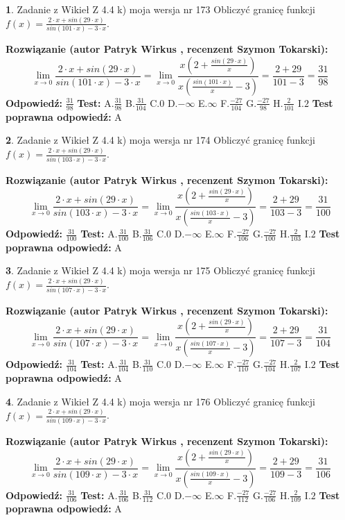 \documentclass[12pt, a4paper]{article}
\theoremstyle{definition} %
\newtheorem{zad}{}
\newcommand{\zadStart}[1]{\begin{zad}#1\newline}
\newcommand{\zadStop}{\end{zad}}
\newcommand{\rozwStart}[2]{\noindent \textbf{Rozwiązanie (autor #1 , recenzent #2): }\newline}
\newcommand{\rozwStop}{\newline}
\newcommand{\odpStart}{\noindent \textbf{Odpowiedź:}\newline}
\newcommand{\odpStop}{\newline}
\newcommand{\testStart}{\noindent \textbf{Test:}\newline}
\newcommand{\testStop}{\newline}
\newcommand{\kluczStart}{\noindent \textbf{Test poprawna odpowiedź:}\newline}
\newcommand{\kluczStop}{\newline}
\begin{document}
\zadStart{Zadanie z Wikieł Z 4.4 k) moja wersja nr 173}
Obliczyć granicę funkcji $f(x)=\frac{2\cdot x +sin(29\cdot x)}{sin(101\cdot x) -3\cdot x}$.
\zadStop
\rozwStart{Patryk Wirkus}{Szymon Tokarski}
$$\lim\limits_{x\to 0}\frac{2\cdot x +sin(29\cdot x)}{sin(101\cdot x) -3\cdot x}
=\lim\limits_{x\to 0}\frac{x(2+\frac{sin(29\cdot x)}{x})}{x(\frac{sin(101\cdot x)}{x}-3)}
=\frac{2+29}{101-3} = \frac{31}{98}$$
\rozwStop
\odpStart
$\frac{31}{98}$
\odpStop
\testStart
A.$\frac{31}{98}$
B.$\frac{31}{104}$
C.$0$
D.$-\infty$
E.$\infty$
F.$\frac{-27}{104}$
G.$\frac{-27}{98}$
H.$\frac{2}{101}$
I.$2$
\testStop
\kluczStart
A
\kluczStop



\zadStart{Zadanie z Wikieł Z 4.4 k) moja wersja nr 174}
Obliczyć granicę funkcji $f(x)=\frac{2\cdot x +sin(29\cdot x)}{sin(103\cdot x) -3\cdot x}$.
\zadStop
\rozwStart{Patryk Wirkus}{Szymon Tokarski}
$$\lim\limits_{x\to 0}\frac{2\cdot x +sin(29\cdot x)}{sin(103\cdot x) -3\cdot x}
=\lim\limits_{x\to 0}\frac{x(2+\frac{sin(29\cdot x)}{x})}{x(\frac{sin(103\cdot x)}{x}-3)}
=\frac{2+29}{103-3} = \frac{31}{100}$$
\rozwStop
\odpStart
$\frac{31}{100}$
\odpStop
\testStart
A.$\frac{31}{100}$
B.$\frac{31}{106}$
C.$0$
D.$-\infty$
E.$\infty$
F.$\frac{-27}{106}$
G.$\frac{-27}{100}$
H.$\frac{2}{103}$
I.$2$
\testStop
\kluczStart
A
\kluczStop



\zadStart{Zadanie z Wikieł Z 4.4 k) moja wersja nr 175}
Obliczyć granicę funkcji $f(x)=\frac{2\cdot x +sin(29\cdot x)}{sin(107\cdot x) -3\cdot x}$.
\zadStop
\rozwStart{Patryk Wirkus}{Szymon Tokarski}
$$\lim\limits_{x\to 0}\frac{2\cdot x +sin(29\cdot x)}{sin(107\cdot x) -3\cdot x}
=\lim\limits_{x\to 0}\frac{x(2+\frac{sin(29\cdot x)}{x})}{x(\frac{sin(107\cdot x)}{x}-3)}
=\frac{2+29}{107-3} = \frac{31}{104}$$
\rozwStop
\odpStart
$\frac{31}{104}$
\odpStop
\testStart
A.$\frac{31}{104}$
B.$\frac{31}{110}$
C.$0$
D.$-\infty$
E.$\infty$
F.$\frac{-27}{110}$
G.$\frac{-27}{104}$
H.$\frac{2}{107}$
I.$2$
\testStop
\kluczStart
A
\kluczStop



\zadStart{Zadanie z Wikieł Z 4.4 k) moja wersja nr 176}
Obliczyć granicę funkcji $f(x)=\frac{2\cdot x +sin(29\cdot x)}{sin(109\cdot x) -3\cdot x}$.
\zadStop
\rozwStart{Patryk Wirkus}{Szymon Tokarski}
$$\lim\limits_{x\to 0}\frac{2\cdot x +sin(29\cdot x)}{sin(109\cdot x) -3\cdot x}
=\lim\limits_{x\to 0}\frac{x(2+\frac{sin(29\cdot x)}{x})}{x(\frac{sin(109\cdot x)}{x}-3)}
=\frac{2+29}{109-3} = \frac{31}{106}$$
\rozwStop
\odpStart
$\frac{31}{106}$
\odpStop
\testStart
A.$\frac{31}{106}$
B.$\frac{31}{112}$
C.$0$
D.$-\infty$
E.$\infty$
F.$\frac{-27}{112}$
G.$\frac{-27}{106}$
H.$\frac{2}{109}$
I.$2$
\testStop
\kluczStart
A
\kluczStop
\end{document}
